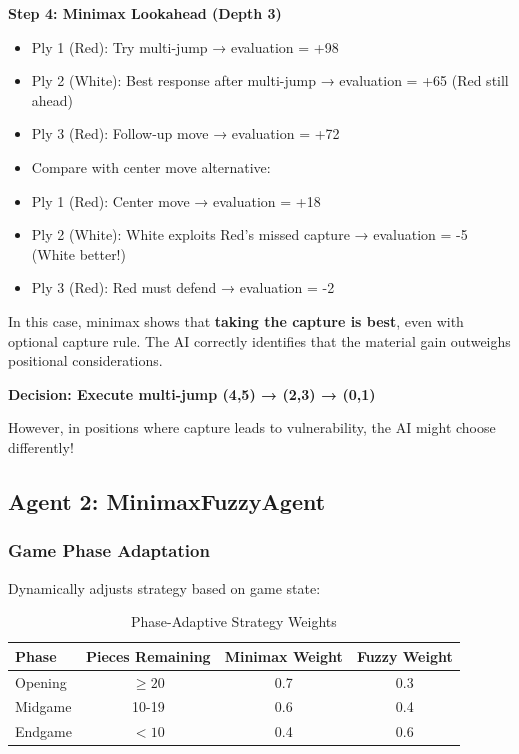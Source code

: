 \documentclass[12pt,a4paper]{article}
\begin{document}
\textbf{Step 4: Minimax Lookahead (Depth 3)}
\begin{itemize}
    \item Ply 1 (Red): Try multi-jump → evaluation = +98
    \item Ply 2 (White): Best response after multi-jump → evaluation = +65 (Red still ahead)
    \item Ply 3 (Red): Follow-up move → evaluation = +72
    
    \item Compare with center move alternative:
    \item Ply 1 (Red): Center move → evaluation = +18
    \item Ply 2 (White): White exploits Red's missed capture → evaluation = -5 (White better!)
    \item Ply 3 (Red): Red must defend → evaluation = -2
\end{itemize}

In this case, minimax shows that \textbf{taking the capture is best}, even with optional capture rule. The AI correctly identifies that the material gain outweighs positional considerations.

\textbf{Decision: Execute multi-jump (4,5) → (2,3) → (0,1)}

However, in positions where capture leads to vulnerability, the AI might choose differently!

\subsection{Agent 2: MinimaxFuzzyAgent}

\subsubsection{Game Phase Adaptation}

Dynamically adjusts strategy based on game state:

\begin{table}[H]
\centering
\caption{Phase-Adaptive Strategy Weights}
\begin{tabular}{@{}lccc@{}}
\toprule
\textbf{Phase} & \textbf{Pieces Remaining} & \textbf{Minimax Weight} & \textbf{Fuzzy Weight} \\
\midrule
Opening & $\geq 20$ & 0.7 & 0.3 \\
Midgame & 10-19 & 0.6 & 0.4 \\
Endgame & $< 10$ & 0.4 & 0.6 \\
\bottomrule
\end{tabular}
\end{table}
\end{document}
